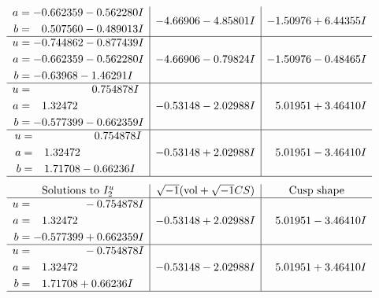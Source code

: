 \documentclass[1p]{elsarticle_modified}
\theoremstyle{definition}
\newcommand{\I}{\sqrt{-1}}
\begin{document}
$$\begin{array}{c|c|c}
\begin{aligned}
a &= -0.662359 - 0.562280 I \\
b &= \phantom{-}0.507560 - 0.489013 I\end{aligned}
 & -4.66906 - 4.85801 I & -1.50976 + 6.44355 I \\ \hline\begin{aligned}
u &= -0.744862 - 0.877439 I \\
a &= -0.662359 - 0.562280 I \\
b &= -0.63968 - 1.46291 I\end{aligned}
 & -4.66906 - 0.79824 I & -1.50976 - 0.48465 I \\ \hline\begin{aligned}
u &= \phantom{-0.000000 -}0.754878 I \\
a &= \phantom{-}1.32472\phantom{ +0.000000I} \\
b &= -0.577399 - 0.662359 I\end{aligned}
 & -0.53148 - 2.02988 I & \phantom{-}5.01951 + 3.46410 I \\ \hline\begin{aligned}
u &= \phantom{-0.000000 -}0.754878 I \\
a &= \phantom{-}1.32472\phantom{ +0.000000I} \\
b &= \phantom{-}1.71708 - 0.66236 I\end{aligned}
 & -0.53148 + 2.02988 I & \phantom{-}5.01951 - 3.46410 I\\
 \hline 
 \end{array}$$\newpage$$\begin{array}{c|c|c}  
\text{Solutions to }I^u_{2}& \I (\text{vol} + \sqrt{-1}CS) & \text{Cusp shape}\\
 \hline 
\begin{aligned}
u &= \phantom{-0.000000 } -0.754878 I \\
a &= \phantom{-}1.32472\phantom{ +0.000000I} \\
b &= -0.577399 + 0.662359 I\end{aligned}
 & -0.53148 + 2.02988 I & \phantom{-}5.01951 - 3.46410 I \\ \hline\begin{aligned}
u &= \phantom{-0.000000 } -0.754878 I \\
a &= \phantom{-}1.32472\phantom{ +0.000000I} \\
b &= \phantom{-}1.71708 + 0.66236 I\end{aligned}
 & -0.53148 - 2.02988 I & \phantom{-}5.01951 + 3.46410 I\\
 \hline 
 \end{array}$$\newpage
\end{document}
